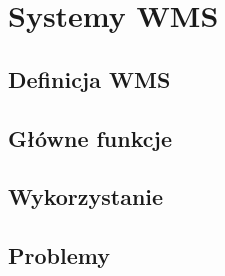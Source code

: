\chapter{Systemy WMS}
\label{c2:c2}

\section{Definicja WMS}

\section{Główne funkcje}

\section{Wykorzystanie}

\section{Problemy}